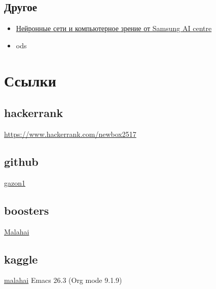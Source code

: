 \documentclass[11pt]{article}
\begin{document}
\subsection{Другое}
\label{sec:org4f3af88}
\begin{itemize}
\item \href{https://stepik.org/cert/347561}{Нейронные сети и компьютерное зрение от Samsung AI centre}
\item ods
\end{itemize}
\section{Ссылки}
\label{sec:orgb1e4b7b}
\subsection{hackerrank}
\label{sec:org30ba6ce}
\url{https://www.hackerrank.com/newbox2517}
\subsection{github}
\label{sec:orgd517014}
\href{https://github.com/gazon1/}{gazon1}
\subsection{boosters}
\label{sec:org62636d1}
\href{https://boosters.pro/user/Malahai}{Malahai}
\subsection{kaggle}
\label{sec:org7bee6a7}
\href{https://www.kaggle.com/malahai}{malahai}
Emacs 26.3 (Org mode 9.1.9)
\end{document}
